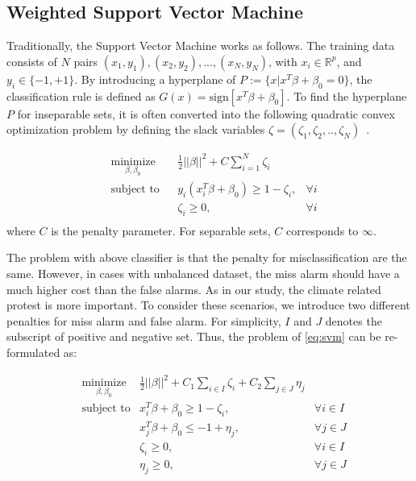 \subsection{Weighted Support Vector Machine}

Traditionally, the Support Vector Machine works as follows. The training data consists of $N$ pairs $(x_1,y_1),(x_2,y_2),...,(x_N,y_N)$, with $x_i\in \mathbb{R}^p$, and $y_i \in \{-1,+1\}$. By introducing a hyperplane of $P:=\{x| x^T\beta+\beta_0=0\}$, the classification rule is defined as $G(x)=\text{sign}[x^T\beta+\beta_0].$ To find the hyperplane $P$ for inseparable sets, it is often converted into the following quadratic convex optimization problem by defining the slack variables $\zeta=(\zeta_1,\zeta_2,..,\zeta_N)$~\cite{hastie2005elements}.

\begin{equation}
    \label{eq:svm}
    \begin{aligned}
& \underset{\beta, \beta_0}{\text{minimize}}
    & & \frac 1 2||\beta||^2 +C \sum_{i=1}^N \zeta_i \\
    & \text{subject to}
        & & y_i(x_i^T\beta+\beta_0) \ge 1-\zeta_i,&\forall i  \\
        & & & \zeta_i \ge 0, &\forall i \\
    \end{aligned}
\end{equation}
where $C$ is the penalty parameter. For separable sets, $C$ corresponds to $\infty$.


The problem with above classifier is that the penalty for misclassification are the same. However, in cases with unbalanced dataset, the miss alarm should have a much higher cost than the false alarms. As in our study, the climate related protest is more important. To consider these scenarios, we introduce two different penalties for miss alarm and false alarm. For simplicity, $I$ and $J$ denotes the subscript of positive and negative set. Thus, the problem of \ref{eq:svm} can be re-formulated as:

\begin{equation}
\label{eq:svm2}
\begin{aligned}
    & \underset{\beta, \beta_0}{\text{minimize}} & \frac 1 2||\beta||^2 + C_1 \sum_{i\in I} \zeta_i + C_2 \sum_{j\in J} \eta_j \\
    & \text{subject to} & x_i^T\beta+\beta_0 \ge 1-\zeta_i,&\forall i \in I  \\
      & & x_j^T\beta+\beta_0 \leq -1+\eta_j,&\forall j \in J  \\
      && \zeta_i \ge 0,&\forall i \in I  \\
      && \eta_j \ge 0,&\forall j \in J  \\
\end{aligned}
\end{equation}


